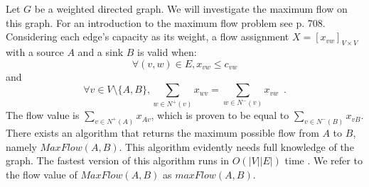 \documentclass[11pt]{llncs}
\theoremstyle{definition}
\begin{document}
    Let $G$ be a weighted directed graph. We will investigate the maximum flow on this graph. For an introduction to the
    maximum flow problem see \cite{clrs} p. 708. Considering each edge's capacity as its weight, a flow assignment
    $X = [x_{vw}]_{V \times V}$ with a source $A$ and a sink $B$ is valid when:
    \begin{equation}
    \label{flow1}
       \forall (v, w) \in E, x_{vw} \leq c_{vw}
    \end{equation}
    and
    \begin{equation}
    \label{flow2}
       \forall v \in V \setminus \{A,B\}, \sum\limits_{w \in N^{+}(v)}x_{wv} = \sum\limits_{w \in N^{-}(v)}x_{vw}
       \enspace.
    \end{equation}
    The flow value is $\sum\limits_{v \in N^{+}\left(A\right)}x_{Av}$, which is proven to be equal to
    $\sum\limits_{v \in N^{-}\left(B\right)}x_{vB}$. There exists an algorithm that returns the maximum possible flow from
    $A$ to $B$, namely $MaxFlow\left(A, B\right)$. This algorithm evidently needs full knowledge of the graph. The fastest
    version of this algorithm runs in $O\left(|V||E|\right)$ time \cite{maxflownm}. We refer to the flow value of
    $MaxFlow\left(A, B\right)$ as $maxFlow\left(A, B\right)$.
\end{document}
